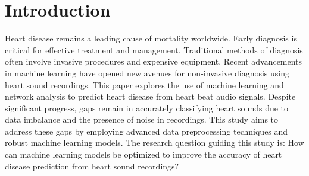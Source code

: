 \section{Introduction}

Heart disease remains a leading cause of mortality worldwide. 
Early diagnosis is critical for effective treatment and management. 
Traditional methods of diagnosis often involve invasive procedures and expensive equipment.
 Recent advancements in machine learning have opened new avenues for non-invasive diagnosis using heart sound recordings. 
 This paper explores the use of machine learning and network analysis to predict heart disease from heart beat audio signals. Despite significant progress, gaps remain in accurately classifying heart sounds due to data imbalance and the presence of noise in recordings. This study aims to address these gaps by employing advanced data preprocessing techniques and robust machine learning models. The research question guiding this study is: How can machine learning models be optimized to improve the accuracy of heart disease prediction from heart sound recordings?
